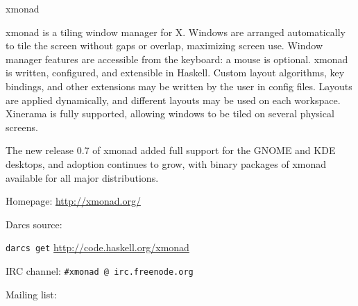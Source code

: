 \begin{hcarentry}{xmonad}
\label{xmonad}
\makeheader

xmonad is a tiling window manager for X. Windows are arranged
automatically to tile the screen without gaps or overlap, maximizing
screen use. Window manager features are accessible from the keyboard: a
mouse is optional. xmonad is written, configured, and extensible in
Haskell. Custom layout algorithms, key bindings, and other extensions may
be written by the user in config files. Layouts are applied
dynamically, and different layouts may be used on each workspace.
Xinerama is fully supported, allowing windows to be tiled on several
physical screens.

The new release 0.7 of xmonad added full support for the GNOME and KDE
desktops, and adoption continues to grow, with binary packages of xmonad
available for all major distributions.

\FurtherReading
\begin{compactitem}
\item Homepage:
 \url{http://xmonad.org/}

\item Darcs source:

 \texttt{darcs get} \url{http://code.haskell.org/xmonad}

\item IRC channel:
 \verb+#xmonad @ irc.freenode.org+

\item Mailing list:
\end{compactitem}
\end{hcarentry}